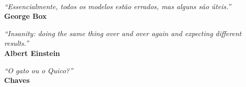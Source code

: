\
\vfill

\begin{flushright}
\hfill \textit{``Essencialmente, todos os modelos est\~{a}o errados, mas alguns s\~{a}o \'{u}teis.''} \\
{\bf George Box}
\end{flushright}

\begin{flushright}
\hfill \textit{``Insanity: doing the same thing over and over again and expecting different results.''} \\
{\bf Albert Einstein}
\end{flushright}

\begin{flushright}
\hfill \textit{``O gato ou o Quico?''} \\
{\bf Chaves}
\end{flushright}

\vspace*{1cm}